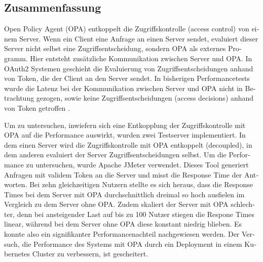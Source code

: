 \begin{otherlanguage}{ngerman}
	\chapter*{Zusammenfassung}
	Open Policy Agent (OPA) entkoppelt die Zugriffskontrolle (access control) von einem Server. Wenn ein Client eine Anfrage an einen Server sendet, evaluiert dieser Server nicht selbst eine Zugriffsentscheidung, sondern OPA als externes Programm. Hier entsteht zusätzliche Kommunikation zwischen Server und OPA. In OAuth2 Systemen geschieht die Evaluierung von Zugriffsentscheidungen anhand von Token, die der Client an den Server sendet. In bisherigen Performancetests wurde die Latenz bei der Kommunikation zwischen Server und OPA nicht in Betrachtung gezogen, sowie keine Zugriffsentscheidungen (access decisions) anhand von Token getroffen \citep{opaperformance:2021:07}.\smallskip

	Um zu untersuchen, inwiefern sich eine Entkopplung der Zugriffskontrolle mit OPA auf die Performance auswirkt, wurden zwei Testserver implementiert. In dem einen Server wird die Zugriffskontrolle mit OPA entkoppelt (decoupled), in dem anderen evaluiert der Server Zugriffsentscheidungen selbst. Um die Performance zu untersuchen, wurde Apache JMeter verwendet. Dieses Tool generiert Anfragen mit validem Token an die Server und misst die Response Time der Antworten. Bei zehn gleichzeitigen Nutzern stellte es sich heraus, dass die Response Times bei dem Server mit OPA durchschnittlich dreimal so hoch ausfielen im Vergleich zu dem Server ohne OPA. Zudem skaliert der Server mit OPA schlechter, denn bei ansteigender Last auf bis zu 100 Nutzer stiegen die Respone Times linear, während bei dem Server ohne OPA diese konstant niedrig blieben. Es konnte also ein signifikanter Performancenachteil nachgewiesen werden. Der Versuch, die Performance des Systems mit OPA durch ein Deployment in einem Kubernetes Cluster zu verbessern, ist gescheitert. 
	

\end{otherlanguage}
